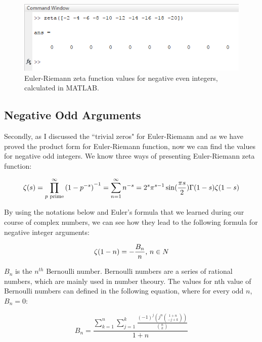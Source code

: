 \documentclass[a4paper]{article}
\begin{document}
\begin{figure}[h!]
  \includegraphics[width=\textwidth]{zerosv.png}
\begin{center}
  \caption{Euler-Riemann zeta
function values for
negative even integers,
calculated in MATLAB.}
  \label{fig:zerosv}
\end{center}
\end{figure}

\subsection{Negative Odd Arguments}

Secondly, as I discussed the “trivial zeros" for Euler-Riemann and as we have proved the product
form for Euler-Riemann function, now we can find the values for negative odd integers. We know
three ways of presenting Euler-Riemann zeta function:

\begin{equation}
  \zeta(s)=\prod_{p \text{ prime}}^{\infty} {(1-p^{-s})}^{-1}=\sum_{n=1}^{\infty} n^{-s}=2^s\pi^{s-1}\sin(\frac{\pi s}{2})\Gamma(1-s)\zeta(1-s)\\
  \end{equation}

By using the notations below and Euler's formula that we learned during our course of complex
numbers, we can see how they lead\cite{Bern} to the following formula
for negative integer arguments:

\begin{equation}
  \label{bnn}
  \zeta(1-n)=-\frac{B_n}{n} \text{, $n\in N$}\\
  \end{equation}

$B_n$ is the $n^{th}$ Bernoulli number. Bernoulli numbers are a series of rational numbers, which are
mainly used in number theoury. The values for nth value of Bernoulli numbers can defined in the
following equation\cite{BernSeq}, where for
every odd $n$, $B_n=0$:

\begin{equation*}
  B_n=\frac{\sum_{k=1}^{n} \sum_{j=1}^{k} \frac{(-1)^j (j^n \binom{1+n}{-j+k}) }{\binom{n}{k}} }{1+n}
  \end{equation*}
\end{document}
